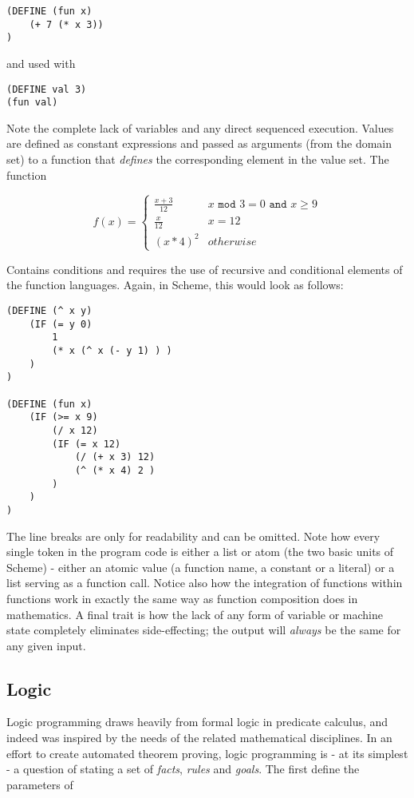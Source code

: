 \begin{lstlisting}
(DEFINE (fun x)
    (+ 7 (* x 3))
)
\end{lstlisting}

and used with 

\begin{lstlisting}
(DEFINE val 3)
(fun val)
\end{lstlisting}

Note the complete lack of variables and any direct sequenced execution. Values are defined as constant expressions and passed as arguments (from the domain set) to a function that \emph{defines} the corresponding element in the value set. The function

\[
f(x) =
\begin{cases} \frac{x+3}{12} & x \texttt{ mod } 3 = 0 \texttt{ and } x \geq 9
\\
\frac{x}{12} & x = 12
\\
(x * 4)^2 & otherwise
\end{cases}
\]

Contains conditions and requires the use of recursive and conditional elements of the function languages. Again, in Scheme, this would look as follows:

\begin{lstlisting}
(DEFINE (^ x y)
    (IF (= y 0)
        1
        (* x (^ x (- y 1) ) )
    )
)

(DEFINE (fun x)
    (IF (>= x 9)
        (/ x 12)
        (IF (= x 12)
            (/ (+ x 3) 12)
            (^ (* x 4) 2 )
        )
    )
)           
\end{lstlisting}

The line breaks are only for readability and can be omitted. Note how every single token in the program code is either a list or atom (the two basic units of Scheme) - either an atomic value (a function name, a constant or a literal) or a list serving as a function call. Notice also how the integration of functions within functions work in exactly the same way as function composition does in mathematics. A final trait is how the lack of any form of variable or machine state completely eliminates side-effecting; the output will \emph{always} be the same for any given input.

\subsection{Logic}
Logic programming draws heavily from formal logic in predicate calculus, and indeed was inspired by the needs of the related mathematical disciplines. In an effort to create automated theorem proving, logic programming is - at its simplest - a question of stating a set of \emph{facts}, \emph{rules} and \emph{goals}. The first define the parameters of 


